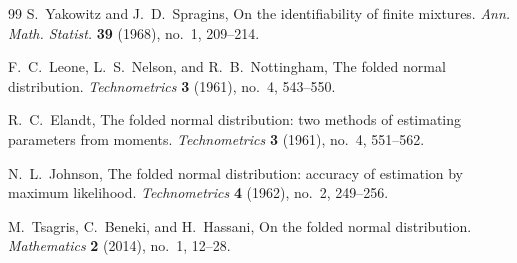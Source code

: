 \documentclass{article}
\theoremstyle{plain}
\theoremstyle{definition}
\theoremstyle{remark}
\numberwithin{equation}{section}
\begin{document}
\begin{thebibliography}{99}
S.~Yakowitz and J.~D.~Spragins,
On the identifiability of finite mixtures.
\emph{Ann. Math. Statist.} \textbf{39} (1968), no.~1, 209--214.

F.~C.~Leone, L.~S.~Nelson, and R.~B.~Nottingham,
The folded normal distribution.
\emph{Technometrics} \textbf{3} (1961), no.~4, 543--550.

R.~C.~Elandt,
The folded normal distribution: two methods of estimating parameters from moments.
\emph{Technometrics} \textbf{3} (1961), no.~4, 551--562.

N.~L.~Johnson,
The folded normal distribution: accuracy of estimation by maximum likelihood.
\emph{Technometrics} \textbf{4} (1962), no.~2, 249--256.

M.~Tsagris, C.~Beneki, and H.~Hassani,
On the folded normal distribution.
\emph{Mathematics} \textbf{2} (2014), no.~1, 12--28.
\end{thebibliography}
\end{document}
